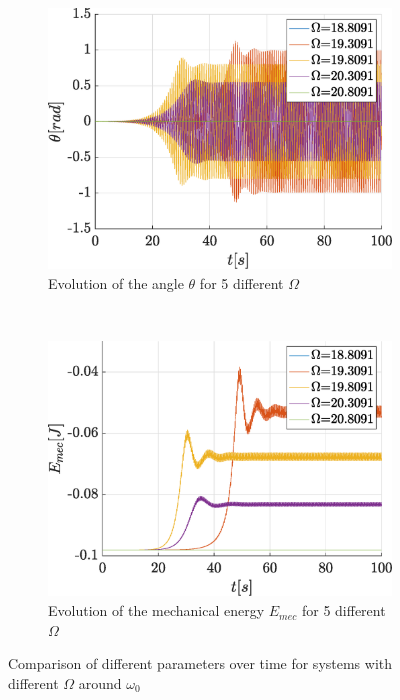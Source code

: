 \documentclass[a4paper,12pt,twoside]{article}
\begin{document}
\begin{figure}[h]
\centering
	\begin{subfigure}[t]{0.45\textwidth}
		\includegraphics[width=\textwidth]{graphs/d_comptheta.eps}
		\caption{Evolution of the angle $\theta$ for 5 different $\Omega$}
		\label{fig:d-comp-theta}
	\end{subfigure}
	~
	\begin{subfigure}[t]{0.45\textwidth}
		\includegraphics[width=\textwidth]{graphs/d_compemec.eps}
		\caption{Evolution of the mechanical energy $E_{mec}$ for 5 different $\Omega$}
		\label{fig:d-comp-emec}
	\end{subfigure}
	\caption{Comparison of different parameters over time for systems with different $\Omega$ around $\omega_0$}
	\label{fig:d-comp}
\end{figure}
\end{document}
